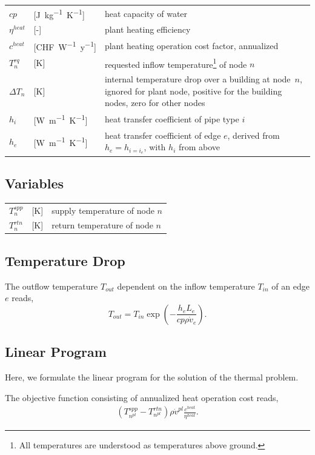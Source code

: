 \documentclass[a4paper,10pt]{article}
\begin{document}
\begin{tabularx}{\textwidth}{llX}
  $cp$ &[\si{J.kg^{-1}.K^{-1}}]& heat capacity of water\\
  $\eta^{heat}$ &[-]& plant heating efficiency\\
  $c^{heat}$ &[\si{CHF.W^{-1}.y^{-1}}]& plant heating operation cost factor,
					 annualized\\
  $T_n^{rq}$ &[\si{K}]& requested inflow temperature\footnote{All temperatures are understood as temperatures above ground.} of node $n$\\
  $\Delta T_n$ &[\si{K}]& internal temperature drop over a building at node~$n$,
                          ignored for plant node,
                          positive for the building nodes,
                          zero for other nodes\\
  $h_i$ &[\si{W.m^{-1}.K^{-1}}]& heat transfer coefficient of pipe type $i$\\
  $h_e$ &[\si{W.m^{-1}.K^{-1}}]& heat transfer coefficient of edge $e$,
                                 derived from $h_e=h_{i=i_e}$,
                                 with $h_i$ from above
\end{tabularx}

\subsection{Variables}

\begin{tabularx}{\textwidth}{llX}
  $T_n^{spp}$ &[\si{K}]& supply temperature of node $n$\\
  $T_n^{rtn}$ &[\si{K}]& return temperature of node $n$
\end{tabularx}

\subsection{Temperature Drop}
The outflow temperature $T_{out}$ dependent on the inflow temperature $T_{in}$ of an edge $e$ reads,
$$T_{out}=T_{in}\exp\left(-\frac{h_e L_e}{cp\rho\dot{v}_{e}}\right).$$

\subsection{Linear Program}

Here, we formulate the linear program for the solution of the thermal problem.

The objective function consisting of annualized heat operation cost reads,
\begin{align}
(T_{n^{pl}}^{spp}-T_{n^{pl}}^{rtn}) \rho \dot{v}^{pl}\frac{c^{heat}}{\eta^{heat}}.
\end{align}
\end{document}
